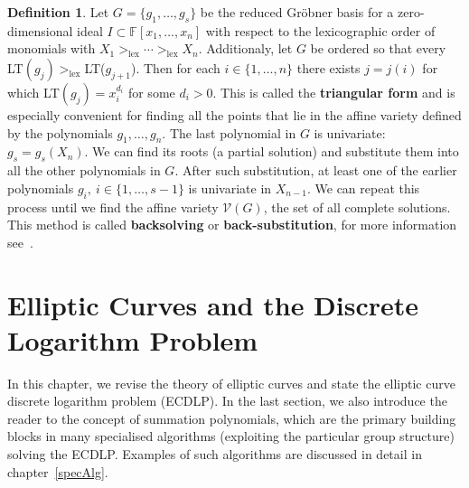 \documentclass[thesis=M,english]{FITthesis}[2012/10/20]
\theoremstyle{remark}
\theoremstyle{definition}
\newtheorem{DF}{Definition}[section]
\begin{document}
\begin{DF}
\label{triagForm}
Let $G = \{g_1,\ldots,g_s\}$ be the reduced Gröbner basis for a zero-dimensional ideal $I \subset \mathbb{F}[x_1,\ldots,x_n]$ with respect to the lexicographic order of monomials with $X_1 >_{\text{lex}} \cdots >_{\text{lex}} X_n$. Additionaly, let $G$ be ordered so that every LT$(g_j) >_{\text{lex}} $LT($g_{j+1}$). Then for each $i \in \{1,\ldots,n\}$ there exists $j=j(i)$ for which LT$(g_j)=x_i^{d_i}$ for some $d_i > 0.$ This is called the \textbf{triangular form} and is especially convenient for finding all the points that lie in the affine variety defined by the polynomials $g_1,\ldots,g_n$. The last polynomial in $G$ is univariate: $g_s = g_s(X_n)$. We can find its roots (a partial solution) and substitute them into all the other polynomials in $G$. After such substitution, at least one of the earlier polynomials $g_i,\ i \in \{1,\ldots,s-1\}$ is univariate in $X_{n-1}$. We can repeat this process until we find the affine variety $\mathcal{V}(G)$, the set of all complete solutions. This method is called \textbf{backsolving} or \textbf{back-substitution}, for more information see~\cite{week11}.
\end{DF}

\chapter{Elliptic Curves and the Discrete Logarithm Problem}\label{ch2}
In this chapter, we revise the theory of elliptic curves and state the elliptic curve discrete logarithm problem (ECDLP). In the last section, we also introduce the reader to the concept of summation polynomials, which are the primary building blocks in many specialised algorithms (exploiting the particular group structure) solving the ECDLP. Examples of such algorithms are discussed in detail in chapter~\ref{specAlg}.
\end{document}
